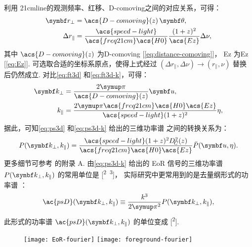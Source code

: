 利用 \ac{21cmline}的观测频率、红移、\acl{D-comoving}之间的对应关系，可得：
\begin{align}
  \B{r}_{\perp} & = \acs{D-comoving}(z) \,\B{\theta} , \\
  \Delta r_{\parallel}
    & = \frac{\acs{speed-light}}{\acs{freq21cm} \acs{H0}}
      \frac{(1+z)^2}{\acs{Ez}} \Delta \nu ,
\end{align}
其中 $\acs{D-comoving}(z)$ 为\acl{D-comoving}
[\autoref{eq:distance-comoving}]，
\acs{Ez} 为\acl{Ez} [\autoref{eq:Ez}].
可选取合适的坐标系原点，使得上式经过
$(\Delta r_{\parallel}, \Delta\nu) \to (r_{\parallel}, \nu)$
替换后仍然成立.
对比\autoref{eq:ft3d} 和\autoref{eq:ft3d-k}，可得：
\begin{align}
  \B{k}_{\perp} & = \frac{2\Cpi}{\acs{D-comoving}(z)} \B{u} ,
  \label{eq:kperp-u}  \\
  k_{\parallel} & =
    \frac{2\Cpi \acs{freq21cm} \acs{H0}\acs{Ez}}{\acs{speed-light}
      (1+z)^2} \eta ,
  \label{eq:klos-eta}
\end{align}
据此，可知\autoref{eq:ps3d} 和\autoref{eq:ps3d-k} 给出的三维功率谱
之间的转换关系为：
\begin{equation}
  P(\B{k}_{\perp}, k_{\parallel}) =
    \frac{\acs{speed-light} (1+z)^2 D_{\!C}^2(z)}{
      \acs{freq21cm} \acs{H0} \acs{Ez}}
    \bar{P}(\B{u}, \eta) .
\end{equation}
更多细节可参考  的附录 A.
由\autoref{eq:ps3d-k} 给出的 EoR 信号的三维功率谱
$P(\B{k}_{\perp}, k_{\parallel})$ 的常用单位是 [\si{\mK\squared\Mpc\cubed}]，
实际研究中更常用到的是去量纲形式的功率谱 \cite{peacock1996}：
\begin{equation}
  \label{eq:ps3d-k2}
  \ac{psD}(\B{k}_{\perp}, k_{\parallel})
    \equiv \frac{k^3}{2\Cpi^2} P(\B{k}_{\perp}, k_{\parallel}) ,
\end{equation}
此形式的功率谱 $\ac{psD}(\B{k}_{\perp}, k_{\parallel})$
的单位变成 [\si{\mK\squared}].

\begin{figure}[htp]
  \centering
  \texttt{[image: EoR-fourier]}%
  \texttt{[image: foreground-fourier]}
  \label{fig:eor-fg-fourier}
\end{figure}

